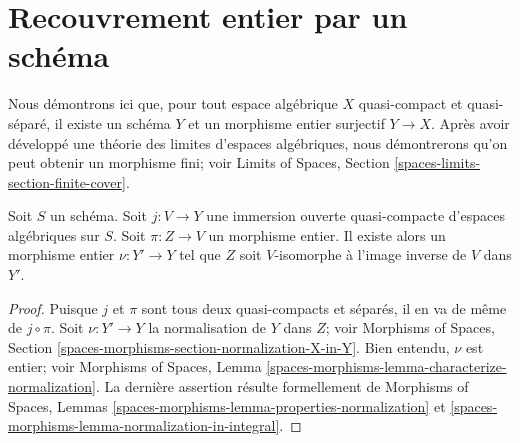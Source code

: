 \section{Recouvrement entier par un schéma}
\label{section-integral-cover}

\noindent
Nous démontrons ici que, pour tout espace algébrique $X$ quasi-compact et
quasi-séparé, il existe un schéma $Y$ et un morphisme entier surjectif
$Y \to X$. Après avoir développé une théorie des limites d'espaces
algébriques, nous démontrerons qu'on peut obtenir un morphisme fini; voir
Limits of Spaces, Section \ref{spaces-limits-section-finite-cover}.

\begin{lemma}
\label{lemma-extend-integral-morphism}
Soit $S$ un schéma. Soit $j : V \to Y$ une immersion ouverte quasi-compacte
d'espaces algébriques sur $S$. Soit $\pi : Z \to V$ un morphisme entier.
Il existe alors un morphisme entier $\nu : Y' \to Y$ tel que $Z$ soit
$V$-isomorphe à l'image inverse de $V$ dans $Y'$.
\end{lemma}

\begin{proof}
Puisque $j$ et $\pi$ sont tous deux quasi-compacts et séparés, il en va de
même de $j \circ \pi$. Soit $\nu : Y' \to Y$ la normalisation de $Y$ dans
$Z$; voir Morphisms of Spaces, Section
\ref{spaces-morphisms-section-normalization-X-in-Y}.
Bien entendu, $\nu$ est entier; voir
Morphisms of Spaces, Lemma
\ref{spaces-morphisms-lemma-characterize-normalization}.
La dernière assertion résulte formellement de
Morphisms of Spaces, Lemmas
\ref{spaces-morphisms-lemma-properties-normalization} et
\ref{spaces-morphisms-lemma-normalization-in-integral}.
\end{proof}
